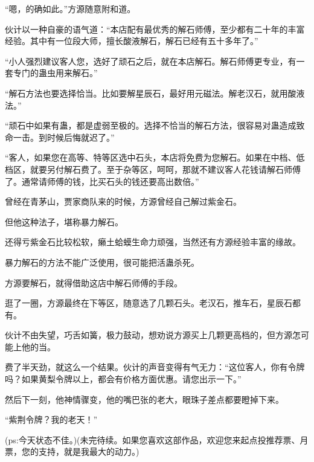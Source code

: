 \begin{this_body}
“嗯，的确如此。”方源随意附和道。

伙计以一种自豪的语气道：“本店配有最优秀的解石师傅，至少都有二十年的丰富经验。其中有一位段大师，擅长酸液解石，解石已经有五十多年了。”

“小人强烈建议客人您，选好了顽石之后，就在本店解石。解石师傅更专业，有一套专门的蛊虫用来解石。”

“解石方法也要选择恰当。比如要解星辰石，最好用元磁法。解老汉石，就用酸液法。”

“顽石中如果有蛊，都是虚弱至极的。选择不恰当的解石方法，很容易对蛊造成致命一击。到时候后悔就迟了。”

“客人，如果您在高等、特等区选中石头，本店将免费为您解石。如果在中档、低档区，就要另付解石费了。至于杂等区，呵呵，那就不建议客人花钱请解石师傅了。通常请师傅的钱，比买石头的钱还要高出数倍。”

曾经在青茅山，贾家商队来的时候，方源曾经自己解过紫金石。

但他这种法子，堪称暴力解石。

还得亏紫金石比较松软，癞土蛤蟆生命力顽强，当然还有方源经验丰富的缘故。

暴力解石的方法不能广泛使用，很可能把活蛊杀死。

方源要解石，就得借助这店中解石师傅的手段。

逛了一圈，方源最终在下等区，随意选了几颗石头。老汉石，推车石，星辰石都有。

伙计不由失望，巧舌如簧，极力鼓动，想劝说方源买上几颗更高档的，但方源怎可能上他的当。

费了半天劲，就这么一个结果。伙计的声音变得有气无力：“这位客人，你有令牌吗？如果黄梨令牌以上，都会有价格方面优惠。请您出示一下。”

然后下一刻，他神情骤变，他的嘴巴张的老大，眼珠子差点都要瞪掉下来。

“紫荆令牌？我的老天！”

(ps:今天状态不佳。)(未完待续。如果您喜欢这部作品，欢迎您来起点投推荐票、月票，您的支持，就是我最大的动力。)

\end{this_body}

